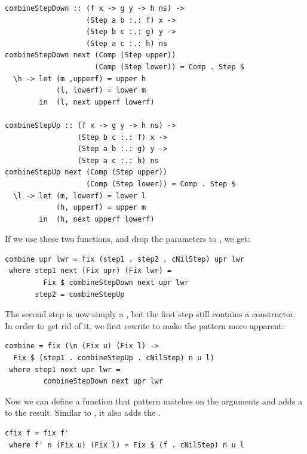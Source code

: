 \documentclass[preprint,natbib]{sigplanconf}
\begin{document}
\begin{small} 
\begin{verbatim}
combineStepDown :: (f x -> g y -> h ns) -> 
                   (Step a b :.: f) x -> 
                   (Step b c :.: g) y -> 
                   (Step a c :.: h) ns
combineStepDown next (Comp (Step upper)) 
                     (Comp (Step lower)) = Comp . Step $
  \h -> let (m ,upperf) = upper h
            (l, lowerf) = lower m
        in  (l, next upperf lowerf)   

combineStepUp :: (f x -> g y -> h ns) ->
                 (Step b c :.: f) x ->
                 (Step a b :.: g) y ->
                 (Step a c :.: h) ns
combineStepUp next (Comp (Step upper)) 
                   (Comp (Step lower)) = Comp . Step $ 
  \l -> let (m, lowerf) = lower l
            (h, upperf) = upper m
        in  (h, next upperf lowerf)   
\end{verbatim}%
\end{small}

If we use these two functions, and drop the parameters to , we get:

\begin{small}%
\begin{verbatim}
combine upr lwr = fix (step1 . step2 . cNilStep) upr lwr
 where step1 next (Fix upr) (Fix lwr) = 
         Fix $ combineStepDown next upr lwr
       step2 = combineStepUp
\end{verbatim}%
\end{small}

The second step is now simply a , but the first step still contains a  constructor. In order to get rid of it, we first rewrite  to make the pattern more apparent:

\begin{small}%
\begin{verbatim}
combine = fix (\n (Fix u) (Fix l) -> 
  Fix $ (step1 . combineStepUp . cNilStep) n u l) 
 where step1 next upr lwr = 
         combineStepDown next upr lwr
\end{verbatim}
\end{small}%

Now we can define a function  that pattern matches on the arguments and adds a  to the result. Similar to , it also adds the .

\begin{small}
\begin{verbatim}
cfix f = fix f' 
 where f' n (Fix u) (Fix l) = Fix $ (f . cNilStep) n u l
\end{verbatim}%
\end{small}
\end{document}
